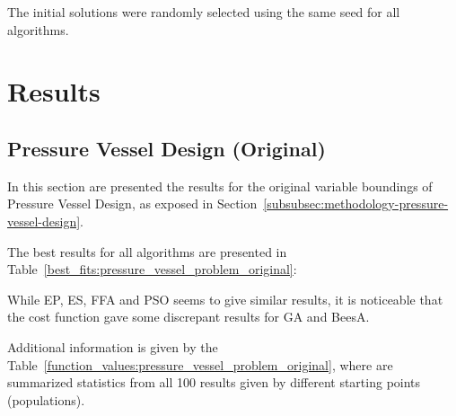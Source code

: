 \documentclass[conference]{IEEEtran}
\begin{document}
The initial solutions were randomly selected using the same seed for all algorithms.

\section{Results}
\label{sec:results}
\subsection{Pressure Vessel Design (Original)}
\label{subsec:pressure_vessel_problem_original}

In this section are presented the results for the original variable boundings of Pressure Vessel Design,
as exposed in Section~\ref{subsubsec:methodology-pressure-vessel-design}.

The best results for all algorithms are presented in Table~\ref{best_fits:pressure_vessel_problem_original}:

\begin{table}[H]
\centering
\caption{Best Fits for Pressure Vessel Design (Original)}
\label{best_fits:pressure_vessel_problem_original}
\end{table}

While EP, ES, FFA and PSO seems to give similar results, it is noticeable that the cost function
gave some discrepant results for GA and BeesA.



Additional information is given by the Table~\ref{function_values:pressure_vessel_problem_original},
where are summarized statistics from all 100 results given by different starting points (populations).
\end{document}
